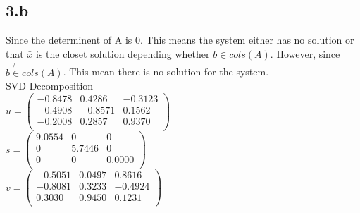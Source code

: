 \documentclass{article}
\begin{document}
\subsection*{3.b}
Since the determinent of A is 0. This means the system either has no solution or that $\bar{x}$ is the closet solution depending whether $b \in cols(A)$. However, since $b \not{\in} cols(A)$. This mean there is no solution for the system.\\
SVD Decomposition\\
$u =
\begin{pmatrix}
   -0.8478  &  0.4286  & -0.3123 \\
   -0.4908  & -0.8571  &  0.1562 \\
   -0.2008 &   0.2857  &  0.9370 \\
\end{pmatrix}$\\

$s =
\begin{pmatrix}
    9.0554     &    0    &     0\\
         0   & 5.7446    &     0\\
         0   &      0   & 0.0000\\
\end{pmatrix}$\\

$v =
\begin{pmatrix}
   -0.5051  &  0.0497  &  0.8616\\
   -0.8081  &  0.3233  & -0.4924\\
    0.3030  &  0.9450  &  0.1231\\
\end{pmatrix}$
\end{document}
